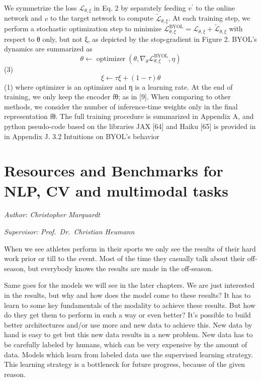 \documentclass[
]{krantz}
\begin{document}
We symmetrize the loss \(\mathcal{L}_{\theta, \xi}\) in Eq. 2 by separately feeding \(v^{\prime}\) to the online network and \(v\) to the target network to compute \(\widetilde{\mathcal{L}}_{\theta, \xi}\). At each training step, we perform a stochastic optimization step to minimize \(\mathcal{L}_{\theta, \xi}^{\mathrm{BYOL}}=\mathcal{L}_{\theta, \xi}+\widetilde{\mathcal{L}}_{\theta, \xi}\)
with respect to θ only, but not ξ, as depicted by the stop-gradient in Figure 2. BYOL's dynamics are summarized as \[
\theta \leftarrow \operatorname{optimizer}\left(\theta, \nabla_{\theta} \mathcal{L}_{\theta, \xi}^{\mathrm{BYOL}}, \eta\right)
\] (3)
\[\xi \leftarrow \tau \xi+(1-\tau) \theta\] (1) where optimizer is an optimizer and η is a learning rate.
At the end of training, we only keep the encoder fθ; as in {[}9{]}. When comparing to other methods, we consider the number of inference-time weights only in the final representation fθ. The full training procedure is summarized in Appendix A, and python pseudo-code based on the libraries JAX {[}64{]} and Haiku {[}65{]} is provided in in Appendix J.
3.2 Intuitions on BYOL's behavior

\hypertarget{resources-and-benchmarks-for-nlp-cv-and-multimodal-tasks}{%
\section{Resources and Benchmarks for NLP, CV and multimodal tasks}\label{resources-and-benchmarks-for-nlp-cv-and-multimodal-tasks}}

\emph{Author: Christopher Marquardt}

\emph{Supervisor: Prof.~Dr.~Christian Heumann}

When we see athletes perform in their sports we only see the results of their hard work prior or till to the event. Most of the time they casually talk about their off-season, but everybody knows the results are made in the off-season.

Same goes for the models we will see in the later chapters. We are just interested in the results, but why and how does the model come to these results? It has to learn to some key fundamentals of the modality to achieve these results. But how do they get them to perform in such a way or even better? It's possible to build better architectures and/or use more and new data to achieve this. New data by hand is easy to get but this new data results in a new problem. New data has to be carefully labeled by humans, which can be very expensive by the amount of data. Models which learn from labeled data use the supervised learning strategy. This learning strategy is a bottleneck for future progress, because of the given reason.
\end{document}

